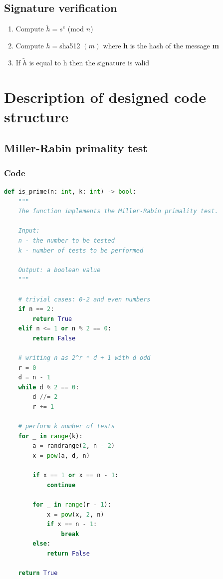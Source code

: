 \documentclass{article}
\begin{document}
\subsection{Signature verification}
\begin{enumerate}
    \item Compute $\tilde{h} = s^e $ (mod $n$)
    \item Compute $  h = $sha512 $(m) $ where \textbf{h} is the hash of the message \textbf{m}
    \item If $\tilde{h}$ is equal to h then the signature is valid

\end{enumerate}

\newpage

\section{Description of designed code structure}
\subsection{Miller-Rabin primality test}
\subsubsection{Code}

\small
\begin{lstlisting}[language=Python]
    def is_prime(n: int, k: int) -> bool:
    """
    The function implements the Miller-Rabin primality test.

    Input:
    n - the number to be tested
    k - number of tests to be performed

    Output: a boolean value
    """

    # trivial cases: 0-2 and even numbers
    if n == 2:
        return True
    elif n <= 1 or n % 2 == 0:
        return False

    # writing n as 2^r * d + 1 with d odd
    r = 0
    d = n - 1
    while d % 2 == 0:
        d //= 2
        r += 1

    # perform k number of tests
    for _ in range(k):
        a = randrange(2, n - 2)
        x = pow(a, d, n)

        if x == 1 or x == n - 1:
            continue

        for _ in range(r - 1):
            x = pow(x, 2, n)
            if x == n - 1:
                break
        else:
            return False

    return True
\end{lstlisting}
\normalsize
\end{document}
